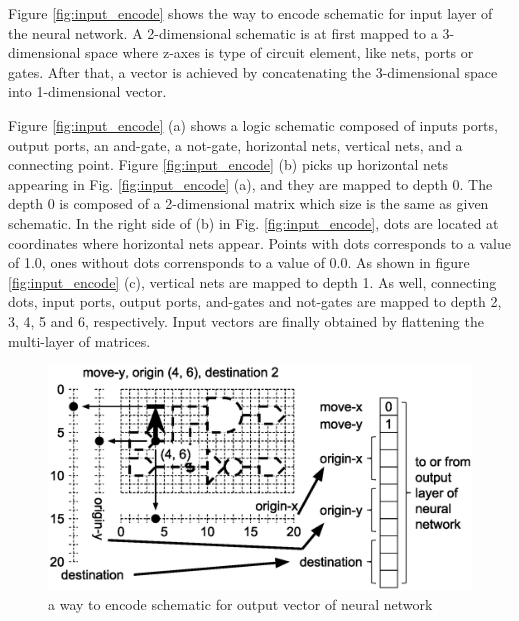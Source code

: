 \documentclass[twocolumn]{article}
\begin{document}
Figure \ref{fig:input_encode} shows the way to encode schematic
for input layer of the neural network.
A 2-dimensional schematic is at first mapped to a 3-dimensional space
where z-axes is type of circuit element, like nets, ports or gates.
After that, a vector is achieved by concatenating the 3-dimensional space
into 1-dimensional vector.

Figure \ref{fig:input_encode} (a) shows a logic schematic composed of
inputs ports, output ports, an and-gate, a not-gate,
horizontal nets, vertical nets, and a connecting point.
Figure \ref{fig:input_encode} (b) picks up horizontal nets appearing
in Fig. \ref{fig:input_encode} (a), and they are mapped to depth 0.
The depth 0 is composed of a 2-dimensional matrix which size is the same
as given schematic.
In the right side of (b) in Fig. \ref{fig:input_encode},
dots are located at coordinates where horizontal nets appear.
Points with dots corresponds to a value of 1.0, ones without dots
corrensponds to a value of 0.0.
As shown in figure \ref{fig:input_encode} (c),
vertical nets are mapped to depth 1.
As well, connecting dots, input ports, output ports, and-gates and not-gates
are mapped to depth 2, 3, 4, 5 and 6, respectively.
Input vectors are finally obtained by flattening the multi-layer of matrices.

\begin{figure}[tb]
 \begin{center}
  \begin{minipage}{\hsize}
   \includegraphics[width=\hsize]{output_encode_02.eps}
   \caption{a way to encode schematic for output vector of neural network}
   \label{fig:output_encode}
  \end{minipage}
 \end{center}
\end{figure}
\end{document}
